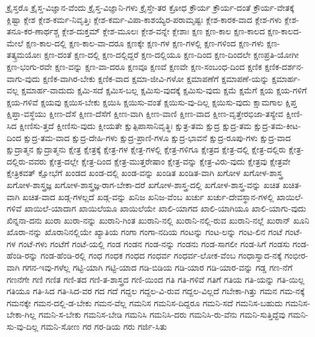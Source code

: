 {ಕ್ರೈಸ್ತರೊ
ಕ್ರೈಸ್ತ-ವಿಜ್ಞಾನ-ವೆಂದು
ಕ್ರೈಸ್ತ-ವಿಜ್ಞಾನಿ-ಗಳು
ಕ್ರೈಸ್ತೇ-ತರ
ಕ್ರೋಧ
ಕ್ರೌರ್ಯ
ಕ್ರೌರ್ಯ-ದಂತೆ
ಕ್ರೌರ್ಯ-ವೇತಕ್ಕೆ
ಕ್ಲಿಷ್ಟಾ
ಕ್ಲೇಶ
ಕ್ಲೇಶ-ಕರ್ಮ-ನಿವೃತ್ತಿಃ
ಕ್ಲೇಶ-ಕರ್ಮ-ವಿಪಾ-ಕಾಶಯ್ಯೆರ-ಪರಾಮೃಷ್ಟಃ
ಕ್ಲೇಶ-ಕಾರಕ-ವಾದ
ಕ್ಲೇಶ-ಗಳು
ಕ್ಲೇಶ-ತನೂ-ಕರ-ಣಾರ್ಥಶ್ಚ
ಕ್ಲೇಶ-ದುಕ್ತಮ್
ಕ್ಲೇಶ-ಮೂಲಃ
ಕ್ಲೇಶ-ವನ್ನೇ
ಕ್ಲೇಶಾಃ
ಕ್ಷಣ
ಕ್ಷಣ-ಕಾಲ
ಕ್ಷಣ-ಕಾಲದ
ಕ್ಷಣ-ಕಾಲದ-ಮೇಲೆ
ಕ್ಷಣ-ಕಾಲ-ದಲ್ಲಿ
ಕ್ಷಣ-ಕಾಲ-ವಾ-ದರೂ
ಕ್ಷಣಕ್ಕೇ
ಕ್ಷಣ-ಗಳ
ಕ್ಷಣ-ಗಳಲ್ಲಿ
ಕ್ಷಣ-ಗಳಿಂದ
ಕ್ಷಣ-ಗಳು
ಕ್ಷಣ-ತತ್ಕ್ರಮಯೋಃ
ಕ್ಷಣ-ದಂತೆ
ಕ್ಷಣ-ದಲ್ಲಿ
ಕ್ಷಣ-ದಲ್ಲಿದ್ದರೆ
ಕ್ಷಣ-ದಲ್ಲಿಯೂ
ಕ್ಷಣ-ದಿಂದ
ಕ್ಷಣ-ದಿಂದಲೇ
ಕ್ಷಣಪ್ರತಿ-ಯೋಗೀ
ಕ್ಷಣ-ಭಂಗು-ರವೇ
ಕ್ಷಣ-ವನ್ನು
ಕ್ಷಣ-ವಾ-ದರೂ
ಕ್ಷಣವೂ
ಕ್ಷಣವೆ
ಕ್ಷಣವೇ
ಕ್ಷಣ-ಸಂಬಂಧ-ದಿಂದ
ಕ್ಷಣಿಕ
ಕ್ಷಣಿಕ-ದರ್ಶನ-ವಾಗು-ವುದು
ಕ್ಷಣಿಕ-ವಾಗಿರ-ಬೇಕು
ಕ್ಷಣಿಕ-ವಾದ
ಕ್ಷಮಾ-ಜೀವಿ-ಗಳೋ
ಕ್ಷಮಾಪಣೆಗೆ
ಕ್ಷಮಾಪಣೆ-ಯನ್ನು
ಕ್ಷಮಾರ್ಹ-ವಲ್ಲ
ಕ್ಷಮಾರ್ಹ-ವಾದುದು
ಕ್ಷಮಿ-ಸದೆ
ಕ್ಷಮಿಸ-ಬಲ್ಲ
ಕ್ಷಮಿಸು-ವುದಕ್ಕೆ
ಕ್ಷಮಿಸು-ವುದು
ಕ್ಷಮೆ
ಕ್ಷಮೆಗೆ
ಕ್ಷಯ
ಕ್ಷಯ-ಗಳಿಗೆ
ಕ್ಷಯ-ಗಳಿವೆ
ಕ್ಷಯವು
ಕ್ಷಯಿಸ-ಬೇಕು
ಕ್ಷಯಿಸಿ
ಕ್ಷಯಿಸು-ವಂತೆ
ಕ್ಷಯಿಸು-ವು-ದಿಲ್ಲ
ಕ್ಷಯಿಸು-ವುದು
ಕ್ಷಾಮಗಾಲ
ಕ್ಷಿಪ್ತ
ಕ್ಷಿಪ್ತಾ-ವಸ್ಥೆಯು
ಕ್ಷೀಣ-ದೆಸೆ
ಕ್ಷೀಣ-ದೆಸೆಗೆ
ಕ್ಷೀಣ-ವಾಗಿ
ಕ್ಷೀಣ-ವಾಣಿ
ಕ್ಷೀಣ-ವಾದ
ಕ್ಷೀಣ-ವೃತ್ತೇರಭಿಜಾ-ತಸ್ಯೇವ
ಕ್ಷೀಣಿ-ಸಿದ
ಕ್ಷೀಣಿಸು-ತ್ತದೆ
ಕ್ಷೀಣಿಸು-ವುದು
ಕ್ಷೀಯತೇ
ಕ್ಷುತ್ಪಿಪಾಸಾನಿವೃತ್ಥಿಃ
ಕ್ಷುತ್ರ-ತಮ
ಕ್ಷುದ್ರ
ಕ್ಷುದ್ರ-ತಮ
ಕ್ಷುದ್ರ-ತಮ-ಕೀಟ-ದಿಂದ
ಕ್ಷುದ್ರ-ತಮ-ವಾದ
ಕ್ಷುದ್ರ-ದೇಹಿ-ಗಳು
ಕ್ಷುದ್ರ-ಪ್ರಾಣಿ-ಗಳೂ
ಕ್ಷುದ್ರ-ಭಾವನೆ
ಕ್ಷುದ್ರ-ರೂಪು-ಗಳು
ಕ್ಷುದ್ರ-ವಾದ
ಕ್ಷುದ್ರಾತ್ಮನ
ಕ್ಷುದ್ರಾತ್ಮನು
ಕ್ಷೇತ್ರ
ಕ್ಷೇತ್ರಕ್ಕೆ
ಕ್ಷೇತ್ರ-ಗಳ
ಕ್ಷೇತ್ರ-ಗಳಲ್ಲಿ
ಕ್ಷೇತ್ರ-ಗಳಿಗೂ
ಕ್ಷೇತ್ರದ
ಕ್ಷೇತ್ರ-ದಲ್ಲಿ
ಕ್ಷೇತ್ರ-ದಲ್ಲಿರು
ಕ್ಷೇತ್ರ-ದಲ್ಲಿರು-ವವರು
ಕ್ಷೇತ್ರ-ದಲ್ಲೇ
ಕ್ಷೇತ್ರ-ದಿಂದ
ಕ್ಷೇತ್ರ-ಮುತ್ತರೇಷಾಂ
ಕ್ಷೇತ್ರ-ವನ್ನು
ಕ್ಷೇತ್ರ-ವಿರು-ವುದು
ಕ್ಷೇತ್ರವು
ಕ್ಷೇತ್ರವೇ
ಕ್ಷೇತ್ರಿಕವತ್
ಕ್ಷೋಭೆಗೆ
ಖಂಡದ
ಖಂಡ-ದಲ್ಲಿ
ಖಂಡ-ವನ್ನು
ಖಂಡಿತ
ಖಂಡಿತ-ವಾಗಿ
ಖಗೋಳ
ಖಗೋಳ-ಶಾಸ್ತ್ರ
ಖಗೋಳ-ಶಾಸ್ತ್ರಜ್ಞ
ಖಗೋಳ-ಶಾಸ್ತ್ರಜ್ಞ-ರಾಗ-ಬೇಕಾ-ದರೆ
ಖಗೋಳ-ಶಾಸ್ತ್ರ-ದಲ್ಲಿ
ಖಗೋಳ-ಶಾಸ್ತ್ರ-ವನ್ನು
ಖಚಿತ
ಖಚಿತ-ವಾಗಿ
ಖಚಿತ-ವಾದ
ಖಡ್ಗ-ಗಳಲ್ಲದೆ
ಖಡ್ಗ-ವನ್ನು
ಖನಿಜ
ಖನಿಜ-ವೆಂಬ
ಖರ್ಚು
ಖರ್ಚು-ದೇವಸ್ಥಾನ-ಗಳಲ್ಲಿ
ಖಾಯಿಲೆ-ಗಳಿವೆ
ಖಾಯಿಲೆ-ಯಾದಾಗ
ಖಾಯಿಲೆಯೂ
ಖಾಯಿಲೆಯೇ
ಖಾಲಿ-ಯಾಗದ
ಖಾಲಿ-ಯಾಗಿಯೂ
ಖಾಲಿ-ಯಾಗು-ವುದು
ಖಿನ್ನನಾ-ದನು
ಖುರಾ
ಖುರಾ-ನನ್ನು
ಖುರಾನಿ-ಗಿಂತ
ಖುರಾನಿ-ನಲ್ಲಿ
ಖುರಾನಿ-ನಲ್ಲಿ-ರುವ
ಖುರಾನಿ-ನಲ್ಲೆ
ಖುರಾನ್
ಖೂನಿ
ಖೊರಾ-ನನ್ನು
ಖೊರಾನಿನಲ್ಲಿಯೇ
ಖ್ಯಾತಿಯ
ಗಂಗಾ
ಗಂಗಾ-ನದಿಯ
ಗಂಟನ್ನು
ಗಂಟ-ಲನ್ನು
ಗಂಟ-ಲಿನ
ಗಂಟೆ
ಗಂಟೆ-ಗಳ
ಗಂಟೆ-ಗಳು
ಗಂಟೆಗೆ
ಗಂಟೆ-ಯಲ್ಲಿ
ಗಂಡ
ಗಂಡನ
ಗಂಡ-ನನ್ನು
ಗಂಡನು
ಗಂಡ-ಸಾಗಲೀ
ಗಂಡ-ಸಿಗೆ
ಗಂಡಸು
ಗಂಡ-ಹೆಂಡಿ-ರನ್ನು
ಗಂಡ-ಹೆಂಡಿ-ರಲ್ಲಿ
ಗಂಧ
ಗಂಧಕ
ಗಂಧದ
ಗಂಧರ್ವ
ಗಂಧರ್ವ-ಲೋಕ-ವೆಂಬ
ಗಂಧಾಸ್ವಾದ-ನಕ್ಕೆ
ಗಂಭೀರ-ವಾಗಿ
ಗಗನ-ಇವು-ಗಳೆಲ್ಲ
ಗಟ್ಟಿ-ಯಾಗಿ
ಗಟ್ಟಿ-ಯಾದ
ಗಡಿ-ಬಿಡಿಯ
ಗಡಿ-ಯಾರ
ಗಡಿ-ಯಾರ-ವನ್ನು
ಗಡ್ಡ
ಗಣ-ನೆಗೆ
ಗಣನೆಗೇ
ಗಣಿ
ಗಣಿತ
ಗಣಿ-ತದ
ಗಣಿ-ತ-ಶಾಸ್ತ್ರದ
ಗಣಿ-ಯಿಂದ
ಗತಿ
ಗತಿ-ಗಳಿವೆ
ಗತಿಗೆ
ಗತಿಯ
ಗತಿ-ಯನ್ನು
ಗತಿ-ಯಿಲ್ಲ
ಗತಿಯೂ
ಗತಿ-ಸಿದ
ಗತಿ-ಸಿದ-ವರ
ಗದ
ಗದೆ
ಗದ್ದಲ
ಗದ್ದಲ-ವಿ-ರುವ
ಗದ್ದಲ-ವಿಲ್ಲದೆ
ಗಬೇಕಾ-ಗಿತ್ತು
ಗಮನ
ಗಮ-ನಕ್ಕೆ
ಗಮನಕ್ಕೇ
ಗಮನ-ದಲ್ಲಿ-ಡ-ಬೇಕು
ಗಮನ-ವೆಲ್ಲ
ಗಮನಿಸ
ಗಮನಿಸ-ದಿದ್ದರೂ
ಗಮನಿ-ಸದೆ
ಗಮನಿಸ-ಬಹುದು
ಗಮನಿಸ-ಬೇಕಾ-ಗಿಲ್ಲ
ಗಮನಿ-ಸ-ಬೇಕು
ಗಮನಿಸ-ಬೇಡಿ
ಗಮನಿಸಿ
ಗಮನಿಸಿ-ದರು
ಗಮನಿಸಿ-ರು-ವೆನು
ಗಮನಿ-ಸುತ್ತಿದ್ದೆವು
ಗಮನಿ-ಸು-ವು-ದಿಲ್ಲ
ಗಮನಿ-ಸೋಣ
ಗರ
ಗರ-ಡಿಯ
ಗರು
ಗರ್ಜಿ-ಸಿತು
}
